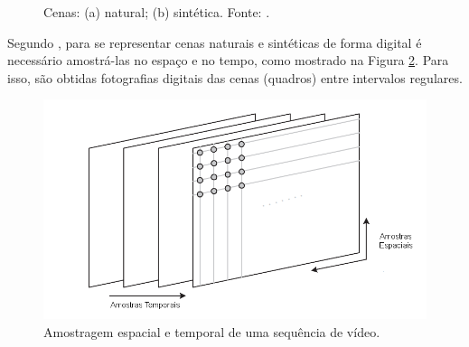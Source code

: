 \begin{figure}[h]
    \centering
    \qquad
    \caption{Cenas: (a) natural; (b) sintética. Fonte: \cite{imagensTeste}.}%
	    
    \label{fig:Cenas}%
\end{figure}

Segundo \cite{garcia2013tecnicas}, para se representar cenas naturais e sintéticas de forma digital é necessário amostrá-las no espaço e no tempo, como mostrado na Figura \ref{AMOSTRAGEM_VIDEO}. Para isso, são obtidas fotografias digitais das cenas (quadros) entre intervalos regulares.

\begin{figure}[h]
	\centering
	\includegraphics[scale=0.65]{figuras/AMOSTRAGEM_VIDEO.png}
	\caption{Amostragem espacial e temporal de uma sequência de vídeo.}
	\label{AMOSTRAGEM_VIDEO}
\end{figure}

